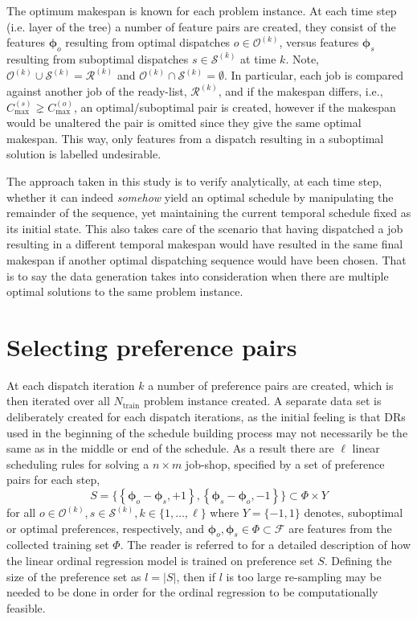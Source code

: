 \documentclass[smallextended]{llncs}
\newcommand{\vphi}{{\boldsymbol{\phi}}}
\begin{document}
The optimum makespan is known for each problem instance. 
At each time step (i.e. layer of the tree) a number of feature pairs are created, they consist of the features 
$\vphi_o$ resulting from optimal dispatches $o\in\mathcal{O}^{(k)}$, versus features $\vphi_s$ resulting from 
suboptimal dispatches $s\in\mathcal{S}^{(k)}$ at time $k$. Note, 
$\mathcal{O}^{(k)}\cup\mathcal{S}^{(k)}=\mathcal{R}^{(k)}$ and $\mathcal{O}^{(k)}\cap\mathcal{S}^{(k)}=\emptyset$.
In particular, each job is compared against another job of the ready-list, $\mathcal{R}^{(k)}$, and if the makespan differs, i.e., $C_{\max}^{(s)} \gneq C_{\max}^{(o)}$, an optimal/suboptimal pair is created, however if the makespan would be unaltered the pair is omitted since they give the same optimal makespan. This way, only features from a dispatch resulting in a suboptimal solution is labelled undesirable.

The approach taken in this study is to verify analytically, at each time step, whether it can indeed \emph{somehow} yield an optimal schedule by manipulating the remainder of the sequence, yet maintaining the current temporal schedule fixed as its initial state. This also takes care of the scenario that having dispatched a job resulting in a different temporal makespan would have resulted in the same final makespan if another optimal dispatching sequence would have been chosen. That is to say the data generation takes into consideration when there are multiple optimal solutions to the same problem instance. 

\section{Selecting preference pairs}\label{sec:strategy}
At each dispatch iteration $k$ a number of preference pairs are created, which is then iterated over all $N_{\text{train}}$ problem instance created. A separate data set is deliberately created for each dispatch iterations, as the initial feeling is that DRs used in the beginning of the schedule building process may not necessarily be the same as in the middle or end of the schedule. As a result there are $\ell$ linear scheduling rules for solving a $n \times m$ job-shop, specified by a set of preference pairs for each step,  
\begin{equation}
S = \big\{\left\{\vphi_o-\vphi_s,+1\right\},\left\{\vphi_s-\vphi_o,-1\right\}\big\} \subset \Phi\times {Y}  \label{eq:Sjssp}
\end{equation}
for all $o\in \mathcal{O}^{(k)},s\in \mathcal{S}^{(k)}, k\in\{1,\ldots,\ell\}$ where $Y=\{-1,1\}$ denotes, suboptimal or optimal preferences, respectively, and $\vphi_o,\vphi_s\in\Phi\subset\mathcal{F}$ are features from the collected training set $\Phi$.
The reader is referred to \cite{InRu11a} for a detailed description of how the linear ordinal regression model is trained on preference set $S$. Defining the size of the preference set as $l=\left|S\right|$, then if  $l$ is too large re-sampling may be needed to be done in order for the ordinal regression to be computationally feasible. 
\end{document}
